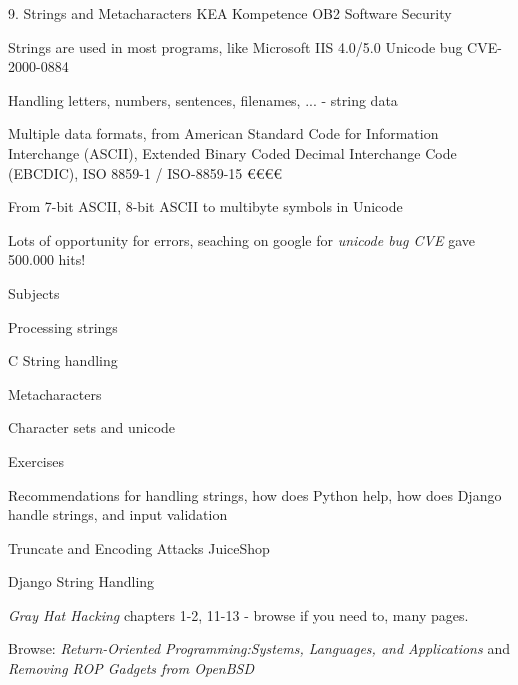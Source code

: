 \documentclass[Screen16to9,17pt]{foils}
\begin{document}
\mytitlepage
{9. Strings and Metacharacters}
{KEA Kompetence OB2 Software Security}



\begin{list1}
\item Strings are used in most programs, like Microsoft IIS 4.0/5.0 Unicode bug CVE-2000-0884
\item Handling letters, numbers, sentences, filenames, ... - string data
\item Multiple data formats, from American Standard Code for Information Interchange (ASCII), Extended Binary Coded Decimal Interchange Code (EBCDIC), ISO 8859-1 / ISO-8859-15 €€€€
\item From 7-bit ASCII, 8-bit ASCII to multibyte symbols in Unicode
\item Lots of opportunity for errors, seaching on google for \emph{unicode bug CVE} gave 500.000 hits!
\end{list1}


\begin{list1}
\item Subjects
\begin{list2}
\item Processing strings
\item C String handling
\item Metacharacters
\item Character sets and unicode
\end{list2}
\item Exercises
\begin{list2}
\item Recommendations for handling strings, how does Python help, how does Django handle strings, and input validation
\item Truncate and Encoding Attacks JuiceShop
\item Django String Handling
\end{list2}
\end{list1}


\begin{list1}
\item \emph{Gray Hat Hacking} chapters 1-2, 11-13 - browse if you need to, many pages.
\item Browse: \emph{Return-Oriented Programming:Systems, Languages, and Applications} and \emph{Removing ROP Gadgets from OpenBSD}
\end{list1}
\end{document}
